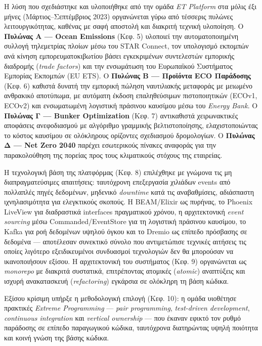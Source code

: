 \documentclass[11pt,a4paper,greek,twoside]{template-xe}
\begin{document}
Η λύση που σχεδιάστηκε και υλοποιήθηκε από την ομάδα \emph{ET Platform}
στα μόλις έξι μήνες (Μάρτιος--Σεπτέμβριος 2023) οργανώνεται γύρω από
τέσσερις πυλώνες λειτουργικότητας, καθένας με σαφή αποστολή και διακριτή
τεχνική υλοποίηση. Ο \textbf{Πυλώνας Α --- Ocean Emissions} (Κεφ. 5)
υλοποιεί την αυτοματοποιημένη συλλογή τηλεμετρίας πλοίων μέσω του STAR
Connect, τον υπολογισμό εκπομπών ανά κίνηση εμπορευματοκιβωτίου βάσει
εγκεκριμένων συντελεστών εμπορικής διαδρομής (\emph{trade factors}) και
την ενσωμάτωση του Ευρωπαϊκού Συστήματος Εμπορίας Εκπομπών (EU ETS). Ο
\textbf{Πυλώνας Β --- Προϊόντα ECO Παράδοσης} (Κεφ. 6) καθιστά δυνατή
την εμπορική πώληση ναυτιλιακής μεταφοράς με μειωμένο ανθρακικό
αποτύπωμα, με αυτόματη έκδοση επαληθεύσιμων πιστοποιητικών (ECOv1,
ECOv2) και ενσωματωμένη λογιστική πράσινου καυσίμου μέσω του
\emph{Energy Bank}. Ο \textbf{Πυλώνας Γ --- Bunker Optimization} (Κεφ.
7) αντικαθιστά χειρωνακτικές αποφάσεις ανεφοδιασμού με αλγόριθμο
γραμμικής βελτιστοποίησης, ελαχιστοποιώντας το κόστος καυσίμου σε
ολόκληρους ορίζοντες σχεδιασμού δρομολογίων. Ο \textbf{Πυλώνας Δ --- Net
Zero 2040} παρέχει εσωτερικούς πίνακες αναφοράς για την παρακολούθηση
της πορείας προς τους κλιματικούς στόχους της εταιρείας.

Η τεχνολογική βάση της πλατφόρμας (Κεφ. 8) επιλέχθηκε με γνώμονα τις μη
διαπραγματεύσιμες απαιτήσεις: ταυτόχρονη επεξεργασία χιλιάδων events από
πολλαπλές πηγές δεδομένων, μηδενικό \emph{downtime} κατά τις
αναβαθμίσεις, αδιάσπαστη ιχνηλασιμότητα για ελεγκτικούς σκοπούς. Η
BEAM/Elixir ως πυρήνας, το Phoenix LiveView για διαδραστικά interfaces
πραγματικού χρόνου, η αρχιτεκτονική \emph{event sourcing} μέσω
Commanded/EventStore για τη λογιστική πράσινου καυσίμου, το Kafka για
ροή δεδομένων υψηλού όγκου και το Dremio ως επίπεδο πρόσβασης σε
δεδομένα --- αποτέλεσαν συνεκτικό σύνολο που αντιμετώπισε τεχνικές
αιτήσεις τις οποίες λιγότερο εξειδικευμένοι συνδυασμοί τεχνολογιών δεν
θα μπορούσαν να ικανοποιήσουν εξίσου. Η αρχιτεκτονική του συστήματος
(Κεφ. 9) οργανώνεται ως \emph{monorepo} με διακριτά συστατικά,
επιτρέποντας ατομικές (\emph{atomic}) αναπτύξεις και ισχυρή ανακατασκευή
(\emph{refactoring}) εγκάρσια σε ολόκληρη τη βάση κώδικα.

Εξίσου κρίσιμη υπήρξε η μεθοδολογική επιλογή (Κεφ. 10): η ομάδα
υιοθέτησε πρακτικές \emph{Extreme Programming} --- \emph{pair
programming}, \emph{test-driven development}, \emph{continuous
integration} και \emph{vertical ownership} --- που έκαναν εφικτό τον
ρυθμό παράδοσης σε επίπεδο παραγωγικού κώδικα, ταυτόχρονα διατηρώντας
υψηλή ποιότητα και κοινή γνώση της βάσης κώδικα.
\end{document}
